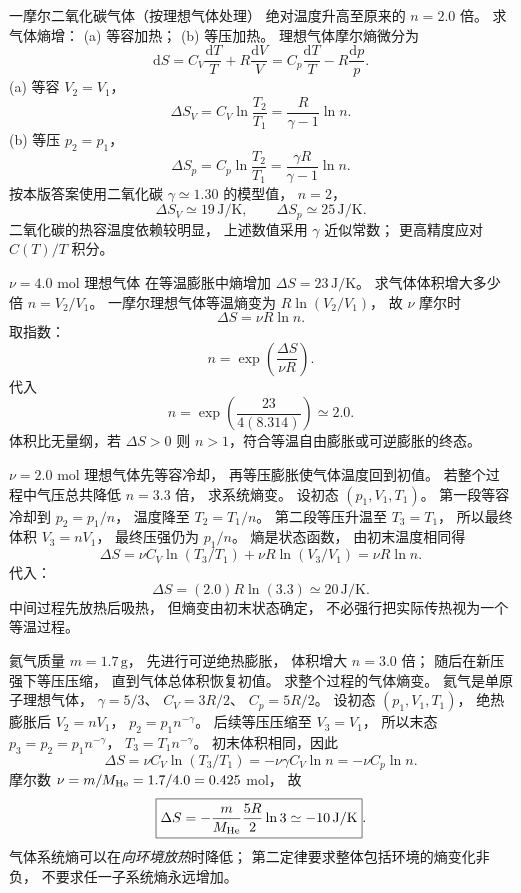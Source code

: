 一摩尔二氧化碳气体（按理想气体处理）
绝对温度升高至原来的
$n=2.0$ 倍。
求气体熵增：
(a) 等容加热；
(b) 等压加热。
\exsolution
理想气体摩尔熵微分为
\[
\mathrm dS=C_V\frac{\mathrm dT}{T}
+R\frac{\mathrm dV}{V}
=C_p\frac{\mathrm dT}{T}-R\frac{\mathrm dp}{p}.
\]
(a) 等容 $V_2=V_1$，
\[
\boxed{\Delta S_V=C_V\ln\frac{T_2}{T_1}
=\frac{R}{\gamma-1}\ln n}.
\]
(b) 等压 $p_2=p_1$，
\[
\boxed{\Delta S_p=C_p\ln\frac{T_2}{T_1}
=\frac{\gamma R}{\gamma-1}\ln n}.
\]
按本版答案使用二氧化碳
$\gamma\simeq1.30$ 的模型值，
$n=2$，
\[
\boxed{\Delta S_V\simeq19\,\mathrm{J/K}},\qquad
\boxed{\Delta S_p\simeq25\,\mathrm{J/K}}.
\]
\excheck 二氧化碳的热容温度依赖较明显，
上述数值采用 $\gamma$ 近似常数；
更高精度应对 $C(T)/T$ 积分。

$\nu=4.0$ mol 理想气体
在等温膨胀中熵增加
$\Delta S=23\,\mathrm{J/K}$。
求气体体积增大多少倍 $n=V_2/V_1$。
\exsolution
一摩尔理想气体等温熵变为
$R\ln(V_2/V_1)$，
故 $\nu$ 摩尔时
\[
\Delta S=\nu R\ln n.
\]
取指数：
\[
\boxed{n=\exp\left(\frac{\Delta S}{\nu R}\right)}.
\]
代入
\[
\boxed{n=\exp\left(\frac{23}{4(8.314)}\right)
\simeq2.0}.
\]
\excheck 体积比无量纲，若 $\Delta S>0$
则 $n>1$，符合等温自由膨胀或可逆膨胀的终态。

$\nu=2.0$ mol 理想气体先等容冷却，
再等压膨胀使气体温度回到初值。
若整个过程中气压总共降低
$n=3.3$ 倍，
求系统熵变。
\exsolution
设初态 $(p_1,V_1,T_1)$。
第一段等容冷却到
$p_2=p_1/n$，
温度降至
$T_2=T_1/n$。
第二段等压升温至 $T_3=T_1$，
所以最终体积
$V_3=nV_1$，
最终压强仍为 $p_1/n$。
熵是状态函数，
由初末温度相同得
\[
\Delta S=\nu C_V\ln(T_3/T_1)
+\nu R\ln(V_3/V_1)
=\nu R\ln n.
\]
代入：
\[
\boxed{\Delta S=(2.0)R\ln(3.3)
\simeq20\,\mathrm{J/K}}.
\]
\excheck 中间过程先放热后吸热，
但熵变由初末状态确定，
不必强行把实际传热视为一个等温过程。

氦气质量 $m=1.7\,\mathrm g$，
先进行可逆绝热膨胀，
体积增大 $n=3.0$ 倍；
随后在新压强下等压压缩，
直到气体总体积恢复初值。
求整个过程的气体熵变。
\exsolution
氦气是单原子理想气体，
$\gamma=5/3$、
$C_V=3R/2$、
$C_p=5R/2$。
设初态
$(p_1,V_1,T_1)$，
绝热膨胀后
$V_2=nV_1$，
$p_2=p_1n^{-\gamma}$。
后续等压压缩至
$V_3=V_1$，
所以末态
$p_3=p_2=p_1n^{-\gamma}$，
$T_3=T_1n^{-\gamma}$。
初末体积相同，因此
\[
\Delta S=\nu C_V\ln(T_3/T_1)
=-\nu\gamma C_V\ln n
=-\nu C_p\ln n.
\]
摩尔数
$\nu=m/M_{\rm He}=1.7/4.0=0.425$ mol，
故
\[
\boxed{\Delta S=
-\frac m{M_{\rm He}}\frac{5R}{2}\ln3
\simeq-10\,\mathrm{J/K}}.
\]
\excheck 气体系统熵可以在\emph{向环境放热}时降低；
第二定律要求整体包括环境的熵变化非负，
不要求任一子系统熵永远增加。

